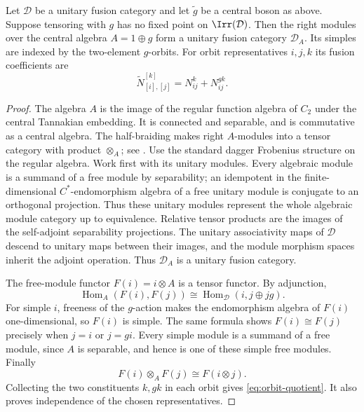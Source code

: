 \begin{proposition}\label{prop:central-boson}
Let $\mathcal D$ be a unitary fusion category and let $\widetilde g$ be
a central boson as above. Suppose tensoring with $g$ has no fixed point
on $\Irr(\mathcal D)$. Then the right modules over the central algebra
$A=1\oplus g$ form a unitary fusion category $\mathcal D_A$. Its simples
are indexed by the two-element $g$-orbits. For orbit representatives
$i,j,k$ its fusion coefficients are
\begin{equation}\label{eq:orbit-quotient}
 \widetilde N_{[i],[j]}^{[k]}=N_{ij}^{k}+N_{ij}^{gk}.
\end{equation}
\end{proposition}
\begin{proof}
The algebra $A$ is the image of the regular function algebra of $C_2$
under the central Tannakian embedding. It is connected and separable,
and is commutative as a central algebra. The half-braiding makes right
$A$-modules into a tensor category with product $\otimes_A$; see
\cite[Theorem~8.23.3]{EGNO}. Use the standard dagger Frobenius structure on the regular algebra.
Work first with its unitary modules. Every algebraic module is a
summand of a free module by separability; an idempotent in the
finite-dimensional $C^*$-endomorphism algebra of a free unitary module
is conjugate to an orthogonal projection. Thus these unitary modules
represent the whole algebraic module category up to equivalence.
Relative tensor products are the images of the self-adjoint
separability projections. The unitary associativity maps of $\mathcal D$ descend
to unitary maps between their images, and the module morphism spaces
inherit the adjoint operation. Thus $\mathcal D_A$ is a unitary fusion
category.

The free-module functor $F(i)=i\otimes A$ is a tensor functor. By
adjunction,
\[
 \operatorname{Hom}_A(F(i),F(j))
 \cong\operatorname{Hom}_{\mathcal D}(i,j\oplus jg).
\]
For simple $i$, freeness of the $g$-action makes the endomorphism
algebra of $F(i)$ one-dimensional, so $F(i)$ is simple. The same formula
shows $F(i)\cong F(j)$ precisely when $j=i$ or $j=gi$. Every simple
module is a summand of a free module, since $A$ is separable, and hence
is one of these simple free modules. Finally
\[
 F(i)\otimes_A F(j)\cong F(i\otimes j).
\]
Collecting the two constituents $k,gk$ in each orbit gives
\eqref{eq:orbit-quotient}. It also proves independence of the chosen
representatives.
\end{proof}

